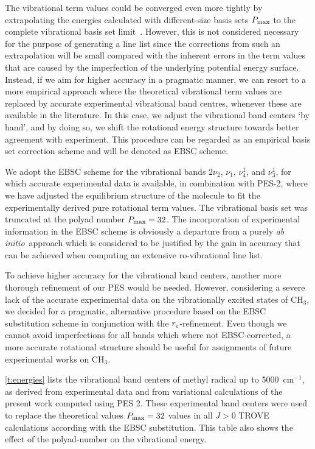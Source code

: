 \documentclass{achemso}
\newcommand{\red}[1]{{\color{red} #1}}
\newcommand{\3}{$_{3}$}
\newcommand{\cm}{cm$^{-1}$}
\newcommand{\abinitio}{\textit{ab initio}}
\newcommand{\ai}{\textit{ab initio}}
\begin{document}
The vibrational term values could be converged even more tightly by
extrapolating the energies calculated with different-size basis sets  $P_{\rm max}$
to the complete vibrational basis set limit~\cite{ph3_08}.
However, this is not considered necessary for the purpose of generating
a line list since the corrections from such an extrapolation will be
small compared with the inherent errors in the term values that are
caused by the imperfection of the underlying potential energy surface.
Instead, if we aim for higher accuracy in a pragmatic manner, we can
 resort to a more empirical approach where the theoretical vibrational
term values are replaced by accurate
 experimental  vibrational band centres, whenever these are
available in the literature.
In this case, we adjust the vibrational band centers `by hand', and
by doing so, we shift the rotational energy structure towards better
agreement with experiment.
This procedure can be regarded as an empirical basis set correction
scheme and will be denoted as EBSC scheme.


 We adopt the EBSC scheme for the vibrational bands $2\nu_2$, $\nu_1$, $\nu_4^1$, and $\nu_3^1$, for which accurate experimental data is available, in combination with PES-2, where we have adjusted the equilibrium structure of the molecule to fit the experimentally derived pure rotational term values. The vibrational basis set was truncated at the polyad number $P_{\rm max}=32$.  The incorporation of experimental information in the
EBSC scheme is obviously a departure from a purely \abinitio\ approach
which is considered to be justified by the gain in accuracy that can
be achieved when computing an extensive ro-vibrational line list.

To achieve higher accuracy for
the vibrational band centers, another more thorough refinement of our
PES would be needed. However, considering a severe lack of the accurate experimental data on the vibrationally excited states of CH$_3$, we decided for a pragmatic, alternative procedure based on the EBSC substitution scheme in conjunction with the $r_{\rm e}$-refinement. Even though we cannot avoid imperfections for all bands which where not EBSC-corrected, a more accurate rotational structure should be useful for assignments of future experimental works on CH$_3$.


 \ref{t:energies} lists the vibrational band centers of methyl radical up to 5000~\cm, as derived
from experimental data and from variational calculations of the present work computed using PES 2. 
These experimental band centers were used to replace the theoretical values $P_{\rm max} = 32$ values in all $J>0$ TROVE calculations according with the EBSC substitution. This table also shows the effect of the polyad-number on the
vibrational energy. %
\end{document}
